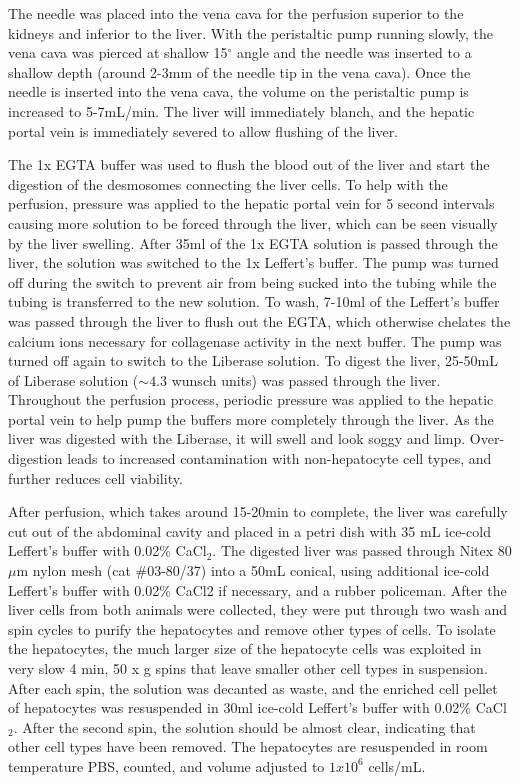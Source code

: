 \documentclass[10pt,letterpaper]{article}
\begin{document}
The needle was placed into the vena cava for the perfusion superior to
the kidneys and inferior to the liver. With the peristaltic pump running
slowly, the vena cava was pierced at shallow 15\(^{\circ}\) angle and
the needle was inserted to a shallow depth (around 2-3mm of the needle
tip in the vena cava). Once the needle is inserted into the vena cava,
the volume on the peristaltic pump is increased to 5-7mL/min. The liver
will immediately blanch, and the hepatic portal vein is immediately
severed to allow flushing of the liver.

The 1x EGTA buffer was used to flush the blood out of the liver and
start the digestion of the desmosomes connecting the liver cells. To
help with the perfusion, pressure was applied to the hepatic portal vein
for 5 second intervals causing more solution to be forced through the
liver, which can be seen visually by the liver swelling. After 35ml of
the 1x EGTA solution is passed through the liver, the solution was
switched to the 1x Leffert's buffer. The pump was turned off during the
switch to prevent air from being sucked into the tubing while the tubing
is transferred to the new solution. To wash, 7-10ml of the Leffert's
buffer was passed through the liver to flush out the EGTA, which
otherwise chelates the calcium ions necessary for collagenase activity
in the next buffer. The pump was turned off again to switch to the
Liberase solution. To digest the liver, 25-50mL of Liberase solution
(\(\sim4.3\) wunsch units) was passed through the liver. Throughout the
perfusion process, periodic pressure was applied to the hepatic portal
vein to help pump the buffers more completely through the liver. As the
liver was digested with the Liberase, it will swell and look soggy and
limp. Over-digestion leads to increased contamination with
non-hepatocyte cell types, and further reduces cell viability.

After perfusion, which takes around 15-20min to complete, the liver was
carefully cut out of the abdominal cavity and placed in a petri dish
with 35 mL ice-cold Leffert's buffer with 0.02\% CaCl\(_{2}\). The
digested liver was passed through Nitex 80 \(\mu\)m nylon mesh (cat
\#03-80/37) into a 50mL conical, using additional ice-cold Leffert's
buffer with 0.02\% CaCl2 if necessary, and a rubber policeman. After the
liver cells from both animals were collected, they were put through two
wash and spin cycles to purify the hepatocytes and remove other types of
cells. To isolate the hepatocytes, the much larger size of the
hepatocyte cells was exploited in very slow 4 min, 50 x g spins that
leave smaller other cell types in suspension. After each spin, the
solution was decanted as waste, and the enriched cell pellet of
hepatocytes was resuspended in 30ml ice-cold Leffert's buffer with
0.02\% CaCl\(_{2}\). After the second spin, the solution should be
almost clear, indicating that other cell types have been removed. The
hepatocytes are resuspended in room temperature PBS, counted, and volume
adjusted to \(1 x 10^{6}\) cells/mL.
\end{document}
